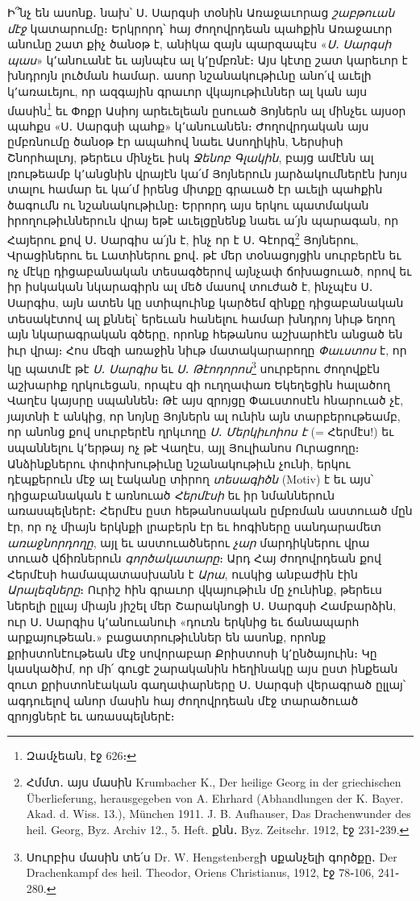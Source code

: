 \documentclass{article}
\begin{document}
{Ի՞նչ են ասոնք․ նախ՝ Ս․ Սարգսի տօնին Առաջաւորաց \emph{շաբթուան մէջ} կատարումը։ Երկրորդ՝ հայ ժողովրդեան պահքին Առաջաւոր անունը շատ քիչ ծանօթ է, անիկա զայն պարզապէս «\emph{Ս․ Սարգսի պաս}» կ՚անուանէ եւ այնպէս ալ կ՚ըմբռնէ։ Այս կէտը շատ կարեւոր է խնդրոյն լուծման համար․ ասոր նշանակութիւնը անո՛վ աւելի կ՚առաւեյու, որ ազգային գրաւոր վկայութիւններ ալ կան այս մասին\footnote{Զամչեան, էջ 626։} եւ Փոքր Ասիոյ արեւելեան ըսուած Յոյներն ալ մինչեւ այսօր պահքս «Ս․ Սարգսի պահք» կ՚անուանեն։ Ժողովրդական այս ըմբռնումը ծանօթ էր ապահով նաեւ Ասողիկին, Ներսիսի Շնորհալւոյ, թերեւս մինչեւ իսկ \emph{Ջենոբ Գլակին}, բայց ամէնն ալ լռութեամբ կ՚անցնին վրայէն կա՛մ Յոյներուն յարձակումներէն խոյս տալու համար եւ կա՛մ իրենց միտքը գրաւած էր աւելի պահքին ծագումն ու նշանակութիւնը։ Երրորդ այս երկու պատմական իրողութիւններուն վրայ եթէ աւելցընենք նաեւ ա՛յն պարագան, որ Հայերու քով Ս․ Սարգիս ա՛յն է, ինչ որ է Ս․ Գէորգ\footnote{Հմմտ․ այս մասին Krumbacher K., Der heilige Georg in der griechischen Überlieferung, herausgegeben von A. Ehrhard (Abhandlungen der K. Bayer. Akad. d. Wiss. 13.), München 1911. J. B. Aufhauser, Das Drachenwunder des heil. Georg, Byz. Archiv 12., 5. Heft. քնն․ Byz. Zeitschr. 1912, էջ 231֊239.} Յոյներու, Վրացիներու եւ Լատիներու քով․ թէ մեր տօնացոյցին սուրբերէն եւ ոչ մէկը դիցաբանական տեսագծերով այնչափ ճոխացուած, որով եւ իր իսկական նկարագիրն ալ մեծ մասով տուժած է, ինչպէս Ս․ Սարգիս, այն ատեն կը ստիպուինք կարծեմ զինքը դիցաբանական տեսակէտով ալ քննել՝ երեւան հանելու համար խնդրոյ նիւթ եղող այն նկարագրական գծերը, որոնք հեթանոս աշխարհէն անցած են իւր վրայ։ Հոս մեզի առաջին նիւթ մատակարարողը \emph{Փաւստոս} է, որ կը պատմէ թէ \emph{Ս․ Սարգիս} եւ \emph{Ս․ Թէոդորոս}\footnote{Սուրբիս մասին տե՛ս Dr. W. Hengstenbergի սքանչելի գործքը․ Der Drachenkampf des heil. Theodor, Oriens Christianus, 1912, էջ 78֊106, 241֊280.} սուրբերու ժողովքէն աշխարհք ղրկուեցան, որպէս զի ուղղափառ Եկեղեցին հալածող Վաղէս կայսրը սպաննեն։ Թէ այս զրոյցը Փաւստոսէն հնարուած չէ, յայտնի է անկից, որ նոյնը Յոյներն ալ ունին այն տարբերութեամբ, որ անոնց քով սուրբերէն ղրկւողը \emph{Ս․ Մերկիւոիոս է} (= Հերմէս!) եւ սպաննելու կ՚երթայ ոչ թէ Վաղէս, այլ Յուլիանոս Ուրացողը։ Անձինքներու փոփոխութիւնը նշանակութիւն չունի, երկու դէպքերուն մէջ ալ էականը տիրող \emph{տեսագիծն} (Motiv) է եւ այս՝ դիցաբանական է առնուած \emph{Հերմէսի} եւ իր նմաններուն առասպելներէ։ Հերմէս ըստ հեթանոսական ըմբռման աստուած մըն էր, որ ոչ միայն երկնքի լրաբերն էր եւ հոգիները սանդարամետ \emph{առաջնորդողը}, այլ եւ աստուածներու \emph{չար} մարդիկներու վրա տուած վճիռներուն \emph{գործակատարը}։ Արդ Հայ ժողովրդեան քով Հերմէսի համապատասխանն է \emph{Արա}, ուսկից անբաժին էին \emph{Արալեզները}։ Ուրիշ հին գրաւոր վկայութիւն մը չունինք, թերեւս ներելի ըլլայ միայն յիշել մեր Շարակնոցի Ս․ Սարգսի Համբարձին, ուր Ս․ Սարգիս կ՚անուանուի «դուռն երկնից եւ ճանապարհ արքայութեան․» բացատրութիւններ են ասոնք, որոնք քրիստոնէութեան մէջ սովորաբար Քրիստոսի կ՚ընծայուին։ Կը կասկածիմ, որ մի՛ գուցէ շարականին հեղինակը այս ըստ ինքեան զուտ քրիստոնէական գաղափարները Ս․ Սարգսի վերագրած ըլլայ՝ ագդուելով անոր մասին հայ ժողովրդեան մէջ տարածուած զրոյցներէ եւ առասպելներէ։

}
\end{document}

